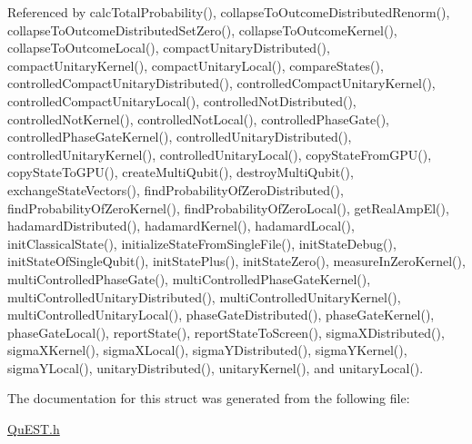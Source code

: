Referenced by calc\+Total\+Probability(), collapse\+To\+Outcome\+Distributed\+Renorm(), collapse\+To\+Outcome\+Distributed\+Set\+Zero(), collapse\+To\+Outcome\+Kernel(), collapse\+To\+Outcome\+Local(), compact\+Unitary\+Distributed(), compact\+Unitary\+Kernel(), compact\+Unitary\+Local(), compare\+States(), controlled\+Compact\+Unitary\+Distributed(), controlled\+Compact\+Unitary\+Kernel(), controlled\+Compact\+Unitary\+Local(), controlled\+Not\+Distributed(), controlled\+Not\+Kernel(), controlled\+Not\+Local(), controlled\+Phase\+Gate(), controlled\+Phase\+Gate\+Kernel(), controlled\+Unitary\+Distributed(), controlled\+Unitary\+Kernel(), controlled\+Unitary\+Local(), copy\+State\+From\+G\+P\+U(), copy\+State\+To\+G\+P\+U(), create\+Multi\+Qubit(), destroy\+Multi\+Qubit(), exchange\+State\+Vectors(), find\+Probability\+Of\+Zero\+Distributed(), find\+Probability\+Of\+Zero\+Kernel(), find\+Probability\+Of\+Zero\+Local(), get\+Real\+Amp\+El(), hadamard\+Distributed(), hadamard\+Kernel(), hadamard\+Local(), init\+Classical\+State(), initialize\+State\+From\+Single\+File(), init\+State\+Debug(), init\+State\+Of\+Single\+Qubit(), init\+State\+Plus(), init\+State\+Zero(), measure\+In\+Zero\+Kernel(), multi\+Controlled\+Phase\+Gate(), multi\+Controlled\+Phase\+Gate\+Kernel(), multi\+Controlled\+Unitary\+Distributed(), multi\+Controlled\+Unitary\+Kernel(), multi\+Controlled\+Unitary\+Local(), phase\+Gate\+Distributed(), phase\+Gate\+Kernel(), phase\+Gate\+Local(), report\+State(), report\+State\+To\+Screen(), sigma\+X\+Distributed(), sigma\+X\+Kernel(), sigma\+X\+Local(), sigma\+Y\+Distributed(), sigma\+Y\+Kernel(), sigma\+Y\+Local(), unitary\+Distributed(), unitary\+Kernel(), and unitary\+Local().



The documentation for this struct was generated from the following file\+:\begin{DoxyCompactItemize}
\item 
\mbox{\hyperlink{QuEST_8h}{Qu\+E\+S\+T.\+h}}\end{DoxyCompactItemize}
